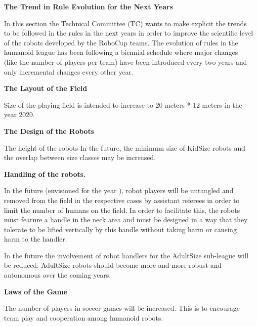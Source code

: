 \clearpage
\sffamily
{\bfseries\color[rgb]{0.4,0.4,0.4}
The Trend in Rule Evolution for the Next Years }

\bigskip

In this section the Technical Committee (TC) wants to make explicit the trends to be followed in the rules in the next years in order to improve the scientific level of the robots developed by the RoboCup teams. The evolution of rules in the humanoid league has been following
a biennial schedule where major changes (like the number of players per team) have been introduced every two years and only incremental changes every other year.

\bigskip

{\bfseries The Layout of the Field}

\headlinebox

Size of the playing field is intended to increase to 20 meters * 12 meters in the year 2020.

\bigskip

{\bfseries The Design of the Robots}

\headlinebox

The height of the robots In the future, the minimum size of KidSize robots and the overlap between size classes may be increased.

\bigskip

{\bfseries Handling of the robots.}

\headlinebox

In the future (envisioned for the year ), robot players will be untangled and removed from the field in the respective cases by assistant referees in order to limit the number of humans on the field. In order to facilitate this, the robots must feature a handle in the neck area and must be designed in a way that they tolerate to be lifted vertically by this handle without taking harm or causing harm to the handler.

\bigskip

In the future the involvement of robot handlers for the AdultSize sub-league will be reduced. AdultSize robots should become more and more robust and autonomous over the coming years.

\bigskip

{\bfseries Laws of the Game}

\headlinebox

The number of players in soccer games will be increased. This is to encourage team play and cooperation among humanoid robots.

